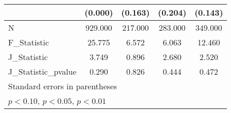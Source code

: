 {\begin{tabular}{l*{4}{c}}
            &     (0.000)         &     (0.163)         &     (0.204)         &     (0.143)         \\
\hline
N           &     929.000         &     217.000         &     283.000         &     349.000         \\
F\_Statistic &      25.775         &       6.572         &       6.063         &      12.460         \\
J\_Statistic &       3.749         &       0.896         &       2.680         &       2.520         \\
J\_Statistic\_pvalue&       0.290         &       0.826         &       0.444         &       0.472         \\
\hline\hline
\multicolumn{5}{l}{\footnotesize Standard errors in parentheses}\\
\multicolumn{5}{l}{\footnotesize \sym{*} \(p<0.10\), \sym{**} \(p<0.05\), \sym{***} \(p<0.01\)}\\
\end{tabular}
}
